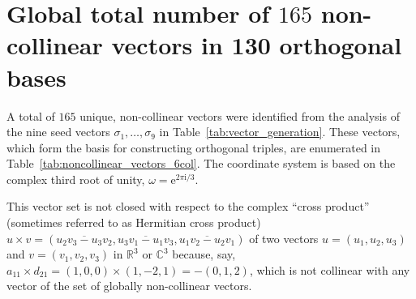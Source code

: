 \documentclass[%
  reprint,
  superscriptaddress,
  showpacs,
  showkeys,
  amsmath,amssymb,
  pra,
  longbibliography,
  floatfix,
  x11names
]{revtex4-2}
\newcommand{\ii}{\mathrm{i}}
\begin{document}
\section{Global total number of $165$ non-collinear vectors in 130 orthogonal bases}

A total of $165$ unique, non-collinear vectors were identified from the analysis of the
nine seed vectors \ensuremath{\sigma_1,\ldots,\sigma_9}
in Table~\ref{tab:vector_generation}.
These vectors, which form the basis for constructing orthogonal triples, are enumerated in Table~\ref{tab:noncollinear_vectors_6col}.
The coordinate system is based on the complex third root of unity, $\omega = \mathrm{e}^{2\pi \ii{}/3}$.

This vector set is not closed with respect to the complex ``cross product''~\cite{harding2025remarksIJTP} (sometimes referred to as Hermitian cross product)
\(
u\times v =  (\overline{u_2v_3-u_3v_2},\overline{u_3v_1-u_1v_3},\overline{u_1v_2-u_2v_1})
\)
of two vectors $u=(u_1,u_2,u_3)$ and $v=(v_1,v_2,v_3)$ in $\mathbb{R}^3$ or $\mathbb{C}^3$ because, say,
$a_{11} \times d_{21} = (1,0,0) \times (1,-2,1) = -(0,1,2)$, which is not collinear with any vector of the set of globally non-collinear vectors.
\end{document}
